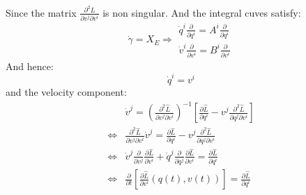 \documentclass[12pt,a4]{article}
\begin{document}
\begin{enumerate}
\begin{align*}
    \end{align*}
    Since the matrix $\frac{\partial^2 \hat L}{\partial v^j \partial v^i}$ is non singular.
    And the integral cuves satisfy:
    \begin{equation*}
      \dot{\gamma} = X_E \Rightarrow 
      \begin{matrix}
        \dot{q}^i \frac{\partial}{\partial q^i} = A^i \frac{\partial}{\partial q^i}\\
        \dot{v}^i \frac{\partial}{\partial v^i} = B^i \frac{\partial}{\partial v^i}
      \end{matrix}
    \end{equation*}
    And hence:
    \begin{equation*}
      \dot{q}^i = v^i
    \end{equation*}
    and the velocity component:
    \begin{align*}
                      & \dot{v}^j  = \left(\frac{\partial^2 \hat L}{\partial v^j \partial v^i}\right)^{-1}\left[\frac{\partial \hat L}{\partial q^i} - v^j \frac{\partial^2 \hat L}{\partial q^j \partial v^i}\right]\\
      \Leftrightarrow & \frac{\partial^2 \hat L}{\partial v^j \partial v^i}\dot{v}^j  = \frac{\partial \hat L}{\partial q^i} - v^j \frac{\partial^2 \hat L}{\partial q^j \partial v^i}\\
      \Leftrightarrow & \dot{v}^j \frac{\partial}{ \partial v^j}\frac{\partial \hat L}{ \partial v^i} + \dot q^j \frac{\partial}{\partial q^j}\frac{\partial \hat L}{\partial v^i} =  \frac{\partial \hat L}{\partial q^i}\\
      \Leftrightarrow & \frac{\partial}{ \partial t}\left[\frac{\partial \hat L}{ \partial v^i}(q(t), v(t)) \right] =  \frac{\partial \hat L}{\partial q^i}\\
    \end{align*}

\end{enumerate}
\end{document}
